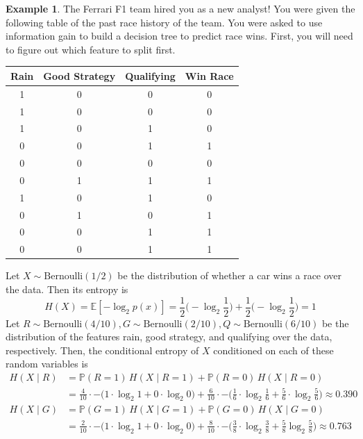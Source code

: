 \documentclass{article}
\theoremstyle{definition}
\newtheorem{example}{Example}[section]
\theoremstyle{remark}
\theoremstyle{definition}
\begin{document}
\begin{example}
The Ferrari F1 team hired you as a new analyst! You were given the following table of the past race history of the team. You were asked to use information gain to build a decision tree to predict race wins. First, you will need to figure out which feature to split first. 

\begin{center}
\begin{tabular}[c]{c|c|c||c}
Rain & Good Strategy & Qualifying & Win Race \\ \hline
1 & 0 & 0 & 0 \\
1 & 0 & 0 & 0 \\
1 & 0 & 1 & 0 \\
0 & 0 & 1 & 1 \\
0 & 0 & 0 & 0 \\
0 & 1 & 1 & 1 \\
1 & 0 & 1 & 0 \\
0 & 1 & 0 & 1 \\
0 & 0 & 1 & 1 \\
0 & 0 & 1 & 1 \\
\end{tabular}
\end{center}
Let $X \sim \mathrm{Bernoulli}(1/2)$ be the distribution of whether a car wins a race over the data. Then its entropy is 
\[H(X) = \mathbb{E}[-\log_2 p(x)] = \frac{1}{2} \big( -\log_2 \frac{1}{2} \big) + \frac{1}{2} \big( -\log_2 \frac{1}{2} \big) = 1\]
Let $R \sim \mathrm{Bernoulli}(4/10), G \sim \mathrm{Bernoulli}(2/10), Q \sim \mathrm{Bernoulli}(6/10)$ be the distribution of the features rain, good strategy, and qualifying over the data, respectively. Then, the conditional entropy of $X$ conditioned on each of these random variables is 
\begin{align*}
    H(X \mid R) & = \mathbb{P}(R = 1)\, H(X \mid R = 1) + \mathbb{P}(R = 0) \, H(X \mid R = 0) \\
    & = \frac{4}{10} \cdot - \big( 1 \cdot \log_2 1 + 0 \cdot \log_2 0 \big) + \frac{6}{10} \cdot - \big( \frac{1}{6} \cdot \log_2 \frac{1}{6} + \frac{5}{6} \cdot \log_2 \frac{5}{6} \big) \approx 0.390 \\
    H(X \mid G) & =  \mathbb{P}(G = 1)\, H(X \mid G = 1) + \mathbb{P}(G = 0) \, H(X \mid G = 0) \\
    & = \frac{2}{10} \cdot - \big( 1 \cdot \log_2 1 + 0 \cdot \log_2 0 \big) + \frac{8}{10} \cdot - \big( \frac{3}{8} \cdot \log_2 \frac{3}{8} + \frac{5}{8} \log_2 \frac{5}{8} \big) \approx 0.763\\

\end{align*}
\end{example}
\end{document}

